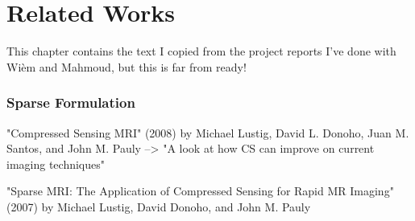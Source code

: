 \chapter{Related Works}



\color{red}
This chapter contains the text I copied from the project reports I've done with Wièm and Mahmoud, but this is far from ready!
\color{black}

\subsection{Sparse Formulation}


"Compressed Sensing MRI" (2008) by Michael Lustig, David L. Donoho, Juan M. Santos, and John M. Pauly --> "A look at how CS can improve on current imaging techniques"

"Sparse MRI: The Application of Compressed Sensing for Rapid MR Imaging" (2007) by Michael Lustig, David Donoho, and John M. Pauly

